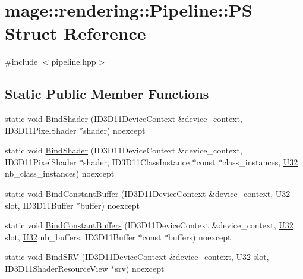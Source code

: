 \hypertarget{structmage_1_1rendering_1_1_pipeline_1_1_p_s}{}\section{mage\+:\+:rendering\+:\+:Pipeline\+:\+:PS Struct Reference}
\label{structmage_1_1rendering_1_1_pipeline_1_1_p_s}


{\ttfamily \#include $<$pipeline.\+hpp$>$}

\subsection*{Static Public Member Functions}
\begin{DoxyCompactItemize}
\item 
static void \mbox{\hyperlink{structmage_1_1rendering_1_1_pipeline_1_1_p_s_ab02215b04c034434a576c7d9addebd2d}{Bind\+Shader}} (I\+D3\+D11\+Device\+Context \&device\+\_\+context, I\+D3\+D11\+Pixel\+Shader $\ast$shader) noexcept
\item 
static void \mbox{\hyperlink{structmage_1_1rendering_1_1_pipeline_1_1_p_s_a0b7ce51bfabf02584ebd2118539de9a8}{Bind\+Shader}} (I\+D3\+D11\+Device\+Context \&device\+\_\+context, I\+D3\+D11\+Pixel\+Shader $\ast$shader, I\+D3\+D11\+Class\+Instance $\ast$const $\ast$class\+\_\+instances, \mbox{\hyperlink{namespacemage_aa5d6eaabaac3cdd01873d6a3d27e90f3}{U32}} nb\+\_\+class\+\_\+instances) noexcept
\item 
static void \mbox{\hyperlink{structmage_1_1rendering_1_1_pipeline_1_1_p_s_a271bf03f9d800f30ba8b8224c5eca21f}{Bind\+Constant\+Buffer}} (I\+D3\+D11\+Device\+Context \&device\+\_\+context, \mbox{\hyperlink{namespacemage_aa5d6eaabaac3cdd01873d6a3d27e90f3}{U32}} slot, I\+D3\+D11\+Buffer $\ast$buffer) noexcept
\item 
static void \mbox{\hyperlink{structmage_1_1rendering_1_1_pipeline_1_1_p_s_af1f10310d45f3272c9c30ddab2e88bd1}{Bind\+Constant\+Buffers}} (I\+D3\+D11\+Device\+Context \&device\+\_\+context, \mbox{\hyperlink{namespacemage_aa5d6eaabaac3cdd01873d6a3d27e90f3}{U32}} slot, \mbox{\hyperlink{namespacemage_aa5d6eaabaac3cdd01873d6a3d27e90f3}{U32}} nb\+\_\+buffers, I\+D3\+D11\+Buffer $\ast$const $\ast$buffers) noexcept
\item 
static void \mbox{\hyperlink{structmage_1_1rendering_1_1_pipeline_1_1_p_s_a59a0c86bddb42deb7192e822cbc957aa}{Bind\+S\+RV}} (I\+D3\+D11\+Device\+Context \&device\+\_\+context, \mbox{\hyperlink{namespacemage_aa5d6eaabaac3cdd01873d6a3d27e90f3}{U32}} slot, I\+D3\+D11\+Shader\+Resource\+View $\ast$srv) noexcept

\end{DoxyCompactItemize}

